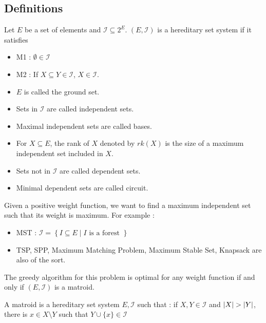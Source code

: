 \documentclass{cours}
\begin{document}
\subsection{Definitions}
\begin{definition}
    Let $E$ be a set of elements and $\mathcal{I} \subseteq 2^{E}$. $\left(E, \mathcal{I}\right)$ is a hereditary set system if it satisfies
    \begin{itemize}
        \item M1 : $\emptyset \in \mathcal{I}$
        \item M2 : If $X \subseteq Y \in \mathcal{I}$, $X \in \mathcal{I}$.
    \end{itemize}
    \begin{itemize}
        \item $E$ is called the ground set.
        \item Sets in $\mathcal{I}$ are called independent sets.
        \item Maximal independent sets are called bases.
        \item For $X \subseteq E$, the rank of $X$ denoted by $rk(X)$ is the size of a maximum independent set included in $X$.
        \item Sets not in $\mathcal{I}$ are called dependent sets.
        \item Minimal dependent sets are called circuit.
    \end{itemize}
\end{definition}

Given a positive weight function, we want to find a maximum independent set such that its weight is maximum. For example :

\begin{itemize}
    \item MST : $\mathcal{I} = \left\{I \subseteq E \mid I \text{ is a forest } \right\}$
    \item TSP, SPP, Maximum Matching Problem, Maximum Stable Set, Knapsack are also of the sort.
\end{itemize}


\begin{theorem}
    The greedy algorithm for this problem is optimal for any weight function if and only if $\left(E, \mathcal{I}\right)$ is a matroid.
\end{theorem}

\begin{definition}
    A matroid is a hereditary set system $E, \mathcal{I}$ such that : if $X, Y \in \mathcal{I}$ and $\left|X\right| > \left|Y\right|$, there is $x \in X \setminus Y$ such that $Y \cup \{x\} \in \mathcal{I}$
\end{definition}
\end{document}
